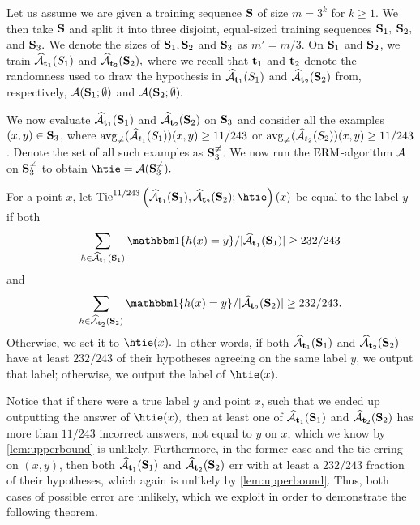 Let us assume we are given a training sequence $ \mathbf{S} $ of size $ m=3^{k} $ for $ k\geq1 $.  
We then take $ \mathbf{S} $ and split it into three disjoint, equal-sized training sequences $ \mathbf{S}_{1},$ $ \mathbf{S}_{2},$ and $ \mathbf{S}_{3}.$ 
We denote the sizes of $ \mathbf{S}_{1},\mathbf{S}_{2}$ and $\mathbf{S}_{3} $ as  $ m'=m/3 $. 
On $ \mathbf{S}_{1}$ and $ \mathbf{S}_{2}$, we train  $\widehat{\mathcal{A}}_{\mathbf{t}_{1}}(S_{1})$ and $\widehat{\mathcal{A}}_{\mathbf{t}_{2}}(\mathbf{S}_{2}),$ where we recall that $ \mathbf{t}_{1} $ and $ \mathbf{t}_{2} $ denote the randomness used to draw the hypothesis in  $\widehat{\mathcal{A}}_{\mathbf{t}_{1}}(S_{1})$ and $\widehat{\mathcal{A}}_{\mathbf{t}_{2}}(\mathbf{S}_{2})$ from, respectively, $ \mathcal{A}(\mathbf{S}_{1};\emptyset) $  and $ \mathcal{A}(\mathbf{S}_{2};\emptyset).$

We now evaluate $\widehat{\mathcal{A}}_{\mathbf{t}_{1}}(\mathbf{S}_{1})$ and $\widehat{\mathcal{A}}_{\mathbf{t}_{2}}(\mathbf{S}_{2})$ on $ \mathbf{S}_{3} $ and consider all the examples $ (x,y)\in \mathbf{S}_{3} $,  where $ \operatorname{\mathrm{avg}_{\not=}}(\widehat{\mathcal{A}}_{t_{1}}(S_{1}))(x,y)\geq11/243 $ or $\operatorname{\mathrm{avg}_{\not=}}(\widehat{\mathcal{A}}_{t_{2}}(S_{2}))(x,y)\geq11/243$. Denote the set of all such examples as $\mathbf{S}_{3}^{\not=}.$ 
We now run the $ \mathrm{ERM} $-algorithm $ \mathcal{A} $ on  $ \mathbf{S}_{3}^{\not=} $ to obtain $\htie =\cA(\rS_{3}^{\not=}).$

For a point $ x $,  let $ \tie^{11/243}\left(\widehat{\cA}_{\rt_{1}}(\rS_{1}),\widehat{\cA}_{\rt_{2}}(\rS_{2}); \htie \right)(x) $ be equal to the label $ y $ if both
\[ \sum_{h\in \widehat{\cA}_{\rt_{1}}(\rS_{1})}\ind\{h(x)=y\}/|\widehat{\cA}_{\rt_{1}}(\rS_{1})|\geq 232/243 \] and 
\[ \sum_{h\in \widehat{\cA}_{\rt_{2}}(\rS_{2})}\ind\{h(x)=y\}/|\widehat{\cA}_{\rt_{2}}(\rS_{2})|\geq 232/243. \]
Otherwise, we set it to $ \htie(x).$
In other words, if both $ \widehat{\mathcal{A}}_{\mathbf{t}_{1}}(\mathbf{S}_{1}) $ and $ \widehat{\mathcal{A}}_{\mathbf{t}_{2}}(\mathbf{S}_{2}) $ have at least $ 232/243 $ of their hypotheses agreeing on the same label $ y $, we output that label; otherwise, we output the label of $ \htie (x).$ 

Notice that if there were a true label $ y $ and point $ x $, such that we ended up outputting the answer of $\htie(x),$ then at least one of $ \widehat{\mathcal{A}}_{\mathbf{t}_{1}}(\mathbf{S}_{1}) $ and $ \widehat{\mathcal{A}}_{\mathbf{t}_{2}}(\mathbf{S}_{2}) $ has more than $ 11/243 $ incorrect answers, not equal to $ y $ on $ x $, which we know by \cref{lem:upperbound} is unlikely. 
Furthermore, in the former case and the tie erring on $(x, y)$, then both $ \widehat{\mathcal{A}}_{\mathbf{t}_{1}}(\mathbf{S}_{1}) $ and $ \widehat{\mathcal{A}}_{\mathbf{t}_{2}}(\mathbf{S}_{2}) $ err with at least a $ 232/243 $ fraction of their hypotheses, which again is unlikely by \cref{lem:upperbound}. Thus, both cases of possible error are unlikely, which we exploit in order to demonstrate the following theorem.         

